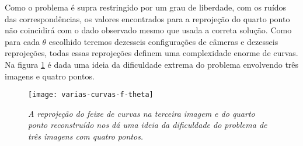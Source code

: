 Como o problema é supra restringido por um grau de liberdade, com os ruídos das correspondências, os valores encontrados para a reprojeção do quarto ponto não coincidirá com o dado observado mesmo que usada a correta solução. Como para cada $\theta$ escolhido teremos dezesseis configurações de câmeras e dezesseis reprojeções, todas essas reprojeções definem uma complexidade enorme de curvas. Na figura \ref{curvas-f(theta)} é dada uma ideia da dificuldade extrema do problema envolvendo três imagens e quatro pontos. 

\begin{figure}[!htb]
\centering
\texttt{[image: varias-curvas-f-theta]}
\caption{\textit{A reprojeção do feixe de curvas na terceira imagem e do quarto ponto reconstruído nos dá uma ideia da dificuldade do problema de três imagens com quatro pontos.}}
\label{curvas-f(theta)}
\end{figure}
